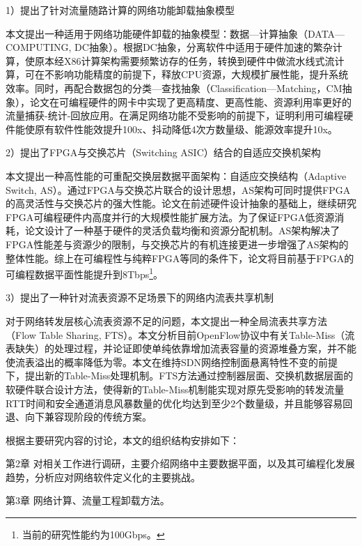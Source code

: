 1）提出了针对流量随路计算的网络功能卸载抽象模型

本文提出一种适用于网络功能硬件卸载的抽象模型：数据—计算抽象（DATA—COMPUTING, DC抽象）。根据DC抽象，分离软件中适用于硬件加速的繁杂计算，使原本经X86计算架构需要频繁访存的任务，转换到硬件中做流水线式流计算，可在不影响功能精度的前提下，释放CPU资源，大规模扩展性能，提升系统效率。同时，再配合数据包的分类—查找抽象（Classification—Matching，CM抽象），论文在可编程硬件的网卡中实现了更高精度、更高性能、资源利用率更好的流量捕获-统计-回放应用。在满足网络功能不受影响的前提下，证明利用可编程硬件能使原有软件性能效提升100x、抖动降低4次方数量级、能源效率提升10x。

2）提出了FPGA与交换芯片（Switching ASIC）结合的自适应交换机架构

本文提出一种高性能的可重配交换层数据平面架构：自适应交换结构（Adaptive Switch, AS）。通过FPGA与交换芯片联合的设计思想，AS架构可同时提供FPGA的高灵活性与交换芯片的强大性能。论文在前述硬件设计抽象的基础上，继续研究FPGA可编程硬件内高度并行的大规模性能扩展方法。为了保证FPGA低资源消耗，论文设计了一种基于硬件的灵活负载均衡和资源分配机制。AS架构解决了FPGA性能差与资源少的限制，与交换芯片的有机连接更进一步增强了AS架构的整体性能。综上在可编程性与纯粹FPGA等同的条件下，论文将目前基于FPGA的可编程数据平面性能提升到8Tbps\footnote{当前的研究性能约为100Gbps。}。


3）提出了一种针对流表资源不足场景下的网络内流表共享机制

对于网络转发层核心流表资源不足的问题，本文提出一种全局流表共享方法（Flow Table Sharing, FTS）。本文分析目前OpenFlow协议中有关Table-Miss（流表缺失）的处理过程，并论证即使单纯依靠增加流表容量的资源堆叠方案，并不能使流表溢出的概率降低为零。本文在维持SDN网络控制面悬离特性不变的前提下，提出新的Table-Miss处理机制。FTS方法通过控制器层面、交换机数据层面的软硬件联合设计方法，使得新的Table-Miss机制能实现对原先受影响的转发流量RTT时间和安全通道消息风暴数量的优化均达到至少2个数量级，并且能够容易回退、向下兼容现阶段的传统方案。


\label{chap15}

根据主要研究内容的讨论，本文的组织结构安排如下：

第2章 对相关工作进行调研，主要介绍网络中主要数据平面，以及其可编程化发展趋势，分析应对网络软件定义化的主要挑战。

第3章 网络计算、流量工程卸载方法。


